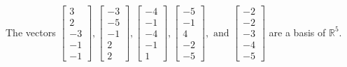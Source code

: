 \begin{exercise}
\begin{exerciseStatement}
  \end{exerciseStatement}
  \begin{exerciseAnswer}
   The vectors \(\left[\begin{array}{r}
3 \\
2 \\
-3 \\
-1 \\
-1
\end{array}\right] , \left[\begin{array}{r}
-3 \\
-5 \\
-1 \\
2 \\
2
\end{array}\right] , \left[\begin{array}{r}
-4 \\
-1 \\
-4 \\
-1 \\
1
\end{array}\right] , \left[\begin{array}{r}
-5 \\
-1 \\
4 \\
-2 \\
-5
\end{array}\right] , \text{ and } \left[\begin{array}{r}
-2 \\
-2 \\
-3 \\
-4 \\
-5
\end{array}\right]\) 
  	 are  a basis of \(\mathbb{R}^5\).
  


  \end{exerciseAnswer}
\end{exercise}